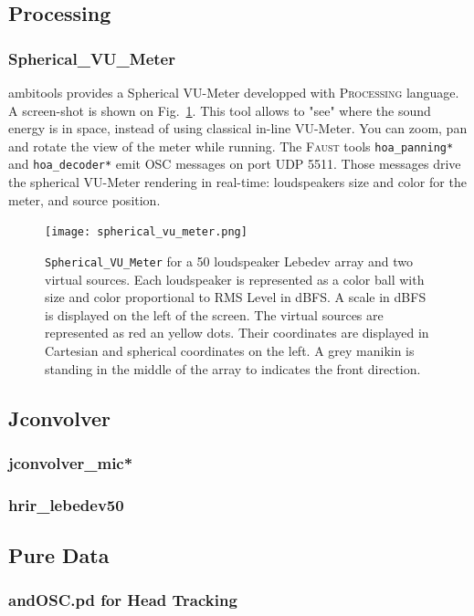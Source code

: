 \documentclass[10pt,a4paper]{article}
\begin{document}
\pagebreak
\subsection{Processing}
\subsubsection{Spherical\_VU\_Meter}
\label{sec:processing}
ambitools provides a Spherical VU-Meter developped with \textsc{Processing} language. A screen-shot is shown on Fig.~\ref{fig:spherical_vu_meter}. This tool allows to "see" where the sound energy is in space, instead of using classical in-line VU-Meter. You can zoom, pan and rotate the view of the meter while running. The \textsc{Faust} tools \lstinline'hoa_panning*' and \lstinline'hoa_decoder*' emit \textsc{OSC} messages on port UDP 5511. Those messages drive the spherical VU-Meter rendering in real-time: loudspeakers size and color for the meter, and source position.
\begin{figure}[!ht]
\centering
\texttt{[image: spherical\_vu\_meter.png]}
\caption{\lstinline'Spherical_VU_Meter' for a 50 loudspeaker Lebedev array and two virtual sources. Each loudspeaker is represented as a color ball with size and color proportional to RMS Level in dBFS. A scale in dBFS is displayed on the left of the screen. The virtual sources are represented as red an yellow dots. Their coordinates are displayed in Cartesian and spherical coordinates on the left. A grey manikin is standing in the middle of the array to indicates the front direction.}
\label{fig:spherical_vu_meter}
\end{figure}

\pagebreak
\subsection{Jconvolver}
\label{sec:jconvolver}
\subsubsection{jconvolver\_mic*}
\subsubsection{hrir\_lebedev50}

\subsection{Pure Data}
\subsubsection{andOSC.pd for Head Tracking}
\label{sec:andOSC}
\end{document}

